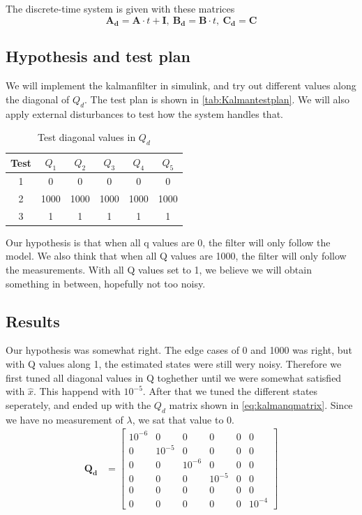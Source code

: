 The discrete-time system is given with these matrices
\begin{equation}
    \mathbf{A_d}=\mathbf{A}\cdot t +\mathbf{I},\
    \mathbf{B_d}=\mathbf{B}\cdot t,\
    \mathbf{C_d}=\mathbf{C}
\end{equation}
\subsection{Hypothesis and test plan}
We will implement the kalmanfilter in simulink, and try out different values along the diagonal of $Q_d$. The test plan is shown in \autoref{tab:Kalmantestplan}. We will also apply external disturbances to test how the system handles that.

\begin{table}[htbp]
    \centering
    \caption{Test diagonal values in $Q_d$}
    \begin{tabular}{c|ccccc}
        \textbf{Test} & $Q_1$ & $Q_2$ & $Q_3$ & $Q_4$ & $Q_5$ \\
        \hline
        1 &0  & 0  & 0  & 0  & 0  \\
        2 &1000  & 1000  & 1000  & 1000  & 1000  \\
        3 &1  & 1  & 1  & 1  & 1  \\
    \end{tabular}
    \label{tab:Kalmantestplan}
\end{table}
Our hypothesis is that when all q values are 0, the filter will only follow the model. We also think that when all Q values are 1000, the filter will only follow the measurements. With all Q values set to 1, we believe we will obtain something in between, hopefully not too noisy.

\subsection{Results}
Our hypothesis was somewhat right. The edge cases of 0 and 1000 was right, but with Q values along 1, the estimated states were still wery noisy. Therefore we first tuned all diagonal values in Q toghether until we were somewhat satisfied with $\hat{x}$. This happend with $10^{-5}$. After that we tuned the different states seperately, and ended up with the $Q_d$ matrix shown in \autoref{eq:kalmanqmatrix}. Since we have no measurement of $\lambda$, we sat that value to 0.
\begin{equation}
    \begin{aligned}
        \mathbf{Q_d}&=
        \begin{bmatrix}
            10^{-6} & 0 & 0 & 0 & 0 & 0 \\
            0 & 10^{-5} & 0 & 0 & 0 & 0\\
            0 & 0 & 10^{-6} & 0 & 0 & 0\\
            0 & 0 & 0 & 10^{-5} & 0 & 0\\
            0 & 0 & 0 & 0 & 0 & 0\\
            0 & 0 & 0 & 0 & 0 & 10^{-4}
        \end{bmatrix}\\
    \end{aligned}
    \label{eq:kalmanqmatrix}
\end{equation}

